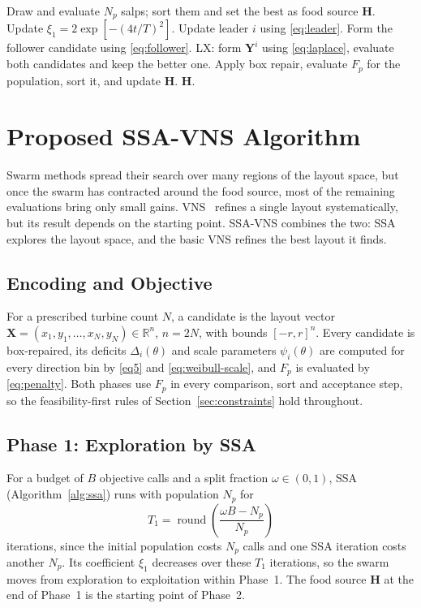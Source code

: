 \documentclass[journal,twoside]{IEEEtran}
\begin{document}
\begin{algorithm}[!t]
\caption{SSA and LX-SSA (lines marked LX: LX-SSA only)}
\label{alg:ssa}
\begin{algorithmic}[1]
\State Draw and evaluate $N_p$ salps; sort them and set the best as food source $\mathbf H$.
    \State Update $\xi_1=2\exp[-(4t/T)^2]$.
            \State Update leader $i$ using \eqref{eq:leader}.
        \Else
            \State Form the follower candidate using \eqref{eq:follower}.
            \State LX: form $\mathbf Y^i$ using \eqref{eq:laplace}, evaluate both candidates and keep the better one.
        \EndIf
    \EndFor
    \State Apply box repair, evaluate $F_p$ for the population, sort it, and update $\mathbf H$.
\EndFor
\State \Return $\mathbf H$.
\end{algorithmic}
\end{algorithm}

\section{Proposed SSA-VNS Algorithm}
\label{sec:hybrid}

Swarm methods spread their search over many regions of the layout space, but once the swarm has contracted around the food source, most of the remaining evaluations bring only small gains. VNS~\cite{Mladenovic1997,Hansen2001} refines a single layout systematically, but its result depends on the starting point. SSA-VNS combines the two: SSA explores the layout space, and the basic VNS refines the best layout it finds.

\subsection{Encoding and Objective}
For a prescribed turbine count $N$, a candidate is the layout vector $\mathbf X=(x_1,y_1,\ldots,x_N,y_N)\in\mathbb R^{n}$, $n=2N$, with bounds $[-r,r]^{n}$. Every candidate is box-repaired, its deficits $\Delta_i(\theta)$ and scale parameters $\psi_i(\theta)$ are computed for every direction bin by \eqref{eq5} and \eqref{eq:weibull-scale}, and $F_p$ is evaluated by \eqref{eq:penalty}. Both phases use $F_p$ in every comparison, sort and acceptance step, so the feasibility-first rules of Section~\ref{sec:constraints} hold throughout.

\subsection{Phase 1: Exploration by SSA}
For a budget of $B$ objective calls and a split fraction $\omega\in(0,1)$, SSA (Algorithm~\ref{alg:ssa}) runs with population $N_p$ for
\[
T_1=\operatorname{round}\!\left(\frac{\omega B-N_p}{N_p}\right)
\]
iterations, since the initial population costs $N_p$ calls and one SSA iteration costs another $N_p$. Its coefficient $\xi_1$ decreases over these $T_1$ iterations, so the swarm moves from exploration to exploitation within Phase~1. The food source $\mathbf H$ at the end of Phase~1 is the starting point of Phase~2.
\end{document}
